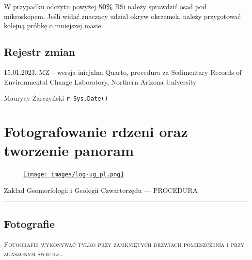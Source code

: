 \documentclass[
  letterpaper,
  DIV=11,
  numbers=noendperiod]{scrreprt}
\begin{document}
W przypadku odczytu powyżej \textbf{50\%} BSi należy sprawdzić osad pod
mikroskopem. Jeśli widać znaczący udział okryw okrzemek, należy
przygotować kolejną próbkę o mniejszej masie.

\hypertarget{pagebreak-rejestr-zmian-2}{%
\section{\texorpdfstring{\newpage{}Rejestr
zmian}{Rejestr zmian}}\label{pagebreak-rejestr-zmian-2}}

15.01.2023, MZ -- wersja inicjalna Quarto, procedura za Sedimentary
Records of Environmental Change Laboratory, Northern Arizona University

Maurycy Żarczyński \texttt{r\ Sys.Date()}

\hypertarget{fotografowanie-rdzeni-oraz-tworzenie-panoram}{%
\chapter{Fotografowanie rdzeni oraz tworzenie
panoram}\label{fotografowanie-rdzeni-oraz-tworzenie-panoram}}

\begin{figure}

\href{https://geomorfologia.ug.edu.pl}{\texttt{[image: images/log-ug\_pl.png]}}

\end{figure}

Zakład Geomorfologii i Geologii Czwartorzędu --- PROCEDURA

\begin{center}\rule{0.5\linewidth}{0.5pt}\end{center}

\hypertarget{fotografie}{%
\section{Fotografie}\label{fotografie}}

\textsc{Fotografie wykonywać tylko przy zamkniętych drzwiach
pomieszczenia i przy zgaszonym świetle.}
\end{document}
